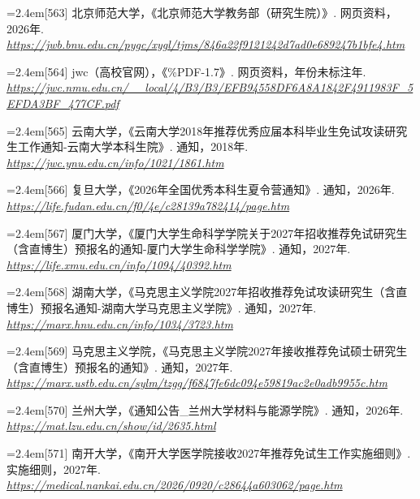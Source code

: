{\par\noindent\hangindent=2.4em\label{src:S0230}{\color{cAccent}[563]} 北京师范大学，《北京师范大学教务部（研究生院）》. 网页资料，2026年. \textit{\url{https://jwb.bnu.edu.cn/pygc/xygl/tjms/846a22f9121242d7ad0e689247b1bfe4.htm}}\par
\par\noindent\hangindent=2.4em\label{src:S0231}{\color{cAccent}[564]} jwc（高校官网），《\%PDF-1.7》. 网页资料，年份未标注年. \textit{\url{https://jwc.nmu.edu.cn/__local/4/B3/B3/EFB94558DF6A8A1842F4911983F_5EFDA3BF_477CF.pdf}}\par
\par\noindent\hangindent=2.4em\label{src:S0234}{\color{cAccent}[565]} 云南大学，《云南大学2018年推荐优秀应届本科毕业生免试攻读研究生工作通知-云南大学本科生院》. 通知，2018年. \textit{\url{https://jwc.ynu.edu.cn/info/1021/1861.htm}}\par
\par\noindent\hangindent=2.4em\label{src:S0244}{\color{cAccent}[566]} 复旦大学，《2026年全国优秀本科生夏令营通知》. 通知，2026年. \textit{\url{https://life.fudan.edu.cn/f0/4e/c28139a782414/page.htm}}\par
\par\noindent\hangindent=2.4em\label{src:S0247}{\color{cAccent}[567]} 厦门大学，《厦门大学生命科学学院关于2027年招收推荐免试研究生（含直博生）预报名的通知-厦门大学生命科学学院》. 通知，2027年. \textit{\url{https://life.xmu.edu.cn/info/1094/40392.htm}}\par
\par\noindent\hangindent=2.4em\label{src:S0252}{\color{cAccent}[568]} 湖南大学，《马克思主义学院2027年招收推荐免试攻读研究生（含直博生）预报名通知-湖南大学马克思主义学院》. 通知，2027年. \textit{\url{https://marx.hnu.edu.cn/info/1034/3723.htm}}\par
\par\noindent\hangindent=2.4em\label{src:S0253}{\color{cAccent}[569]} 马克思主义学院，《马克思主义学院2027年接收推荐免试硕士研究生（含直博生）预报名的通知》. 通知，2027年. \textit{\url{https://marx.ustb.edu.cn/sylm/tzgg/f6847fe6dc094e59819ac2e0adb9955c.htm}}\par
\par\noindent\hangindent=2.4em\label{src:S0255}{\color{cAccent}[570]} 兰州大学，《通知公告\_兰州大学材料与能源学院》. 通知，2026年. \textit{\url{https://mat.lzu.edu.cn/show/id/2635.html}}\par
\par\noindent\hangindent=2.4em\label{src:S0267}{\color{cAccent}[571]} 南开大学，《南开大学医学院接收2027年推荐免试生工作实施细则》. 实施细则，2027年. \textit{\url{https://medical.nankai.edu.cn/2026/0920/c28644a603062/page.htm}}\par
}

